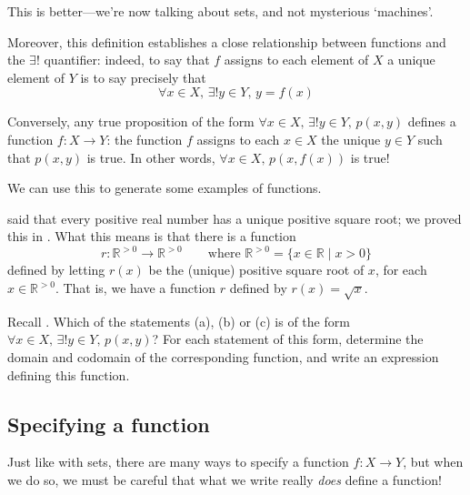 This is better---we're now talking about sets, and not mysterious `machines'.

Moreover, this definition establishes a close relationship between functions and the $\exists !$ quantifier: indeed, to say that $f$ assigns to each element of $X$ a unique element of $Y$ is to say precisely that
\[ \forall x \in X,\, \exists ! y \in Y,\, y = f(x) \]

Conversely, any true proposition of the form $\forall x \in X,\, \exists ! y \in Y,\, p(x,y)$ defines a function $f : X \to Y$: the function $f$ assigns to each $x \in X$ the unique $y \in Y$ such that $p(x,y)$ is true. In other words, $\forall x \in X,\, p(x,f(x))$ is true!

We can use this to generate some examples of functions.

\begin{example}
\label{exPositiveSquareRootFunction}
 said that every positive real number has a unique positive square root; we proved this in . What this means is that there is a function
\[ r : \mathbb{R}^{>0} \to \mathbb{R}^{>0} \qquad \text{where } \mathbb{R}^{>0} = \{ x \in \mathbb{R} \mid x > 0 \} \]
defined by letting $r(x)$ be the (unique) positive square root of $x$, for each $x \in \mathbb{R}^{>0}$. That is, we have a function $r$ defined by $r(x)=\sqrt{x}$.
\end{example}

\begin{exercise}
Recall . Which of the statements (a), (b) or (c) is of the form $\forall x \in X,\, \exists ! y \in Y,\, p(x,y)$? For each statement of this form, determine the domain and codomain of the corresponding function, and write an expression defining this function.
\end{exercise}

\subsection*{Specifying a function}

Just like with sets, there are many ways to specify a function $f : X \to Y$, but when we do so, we must be careful that what we write really \textit{does} define a function!

